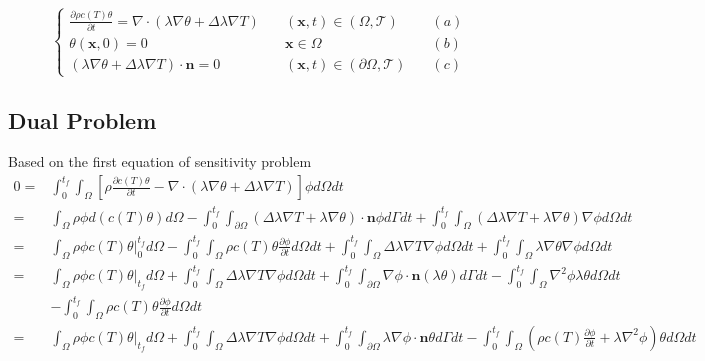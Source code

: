 \documentclass[UTF-8]{article}
\begin{document}
\begin{equation}
	\left\{
	\begin{array}{lll}
		\frac{\partial \rho c(T) \theta}{\partial t} = \nabla \cdot \left( \lambda \nabla \theta + \Delta \lambda \nabla T \right)	\quad & (\pmb{x}, t) \in (\Omega , \mathcal{T}) \quad & (a) \\
		\theta (\pmb{x}, 0) = 0 \quad & \pmb{x} \in \Omega \quad & (b) \\
		\left( \lambda \nabla \theta + \Delta \lambda \nabla T \right) \cdot \pmb{n} = 0 \quad & (\pmb{x}, t) \in (\partial \Omega, \mathcal{T}) \quad & (c)
	\end{array}
	\right.
\end{equation}

\subsection{Dual Problem}
Based on the first equation of sensitivity problem
\begin{align}
	0 = & \int_{0}^{t_f} \int_{\Omega} \left[ \rho \frac{\partial c(T) \theta}{\partial t} - \nabla \cdot \left( \lambda \nabla \theta + \Delta \lambda \nabla T \right) \right] \phi d\Omega dt \nonumber \\
	= & \int_{\Omega} \rho \phi d\left( c(T) \theta \right) d\Omega - \int_{0}^{t_f}\int_{\partial \Omega} \left( \Delta \lambda \nabla T + \lambda \nabla \theta \right) \cdot \pmb{n} \phi d\Gamma dt + \int_{0}^{t_f} \int_{\Omega} \left( \Delta \lambda \nabla T + \lambda \nabla \theta \right) \nabla \phi d\Omega dt \nonumber \\
	= & \int_{\Omega} \rho \phi c(T) \theta \big|_{0}^{t_f} d\Omega - \int_{0}^{t_f} \int_{\Omega} \rho c(T) \theta \frac{\partial \phi}{\partial t} d\Omega dt + \int_{0}^{t_f} \int_{\Omega} \Delta \lambda \nabla T \nabla \phi d\Omega dt + \int_{0}^{t_f} \int_{\Omega} \lambda \nabla \theta \nabla \phi d\Omega dt \nonumber \\
	= & \int_{\Omega} \rho \phi c(T) \theta \big|_{t_f} d\Omega + \int_{0}^{t_f} \int_{\Omega} \Delta \lambda \nabla T \nabla \phi d\Omega dt + \int_{0}^{t_f} \int_{\partial \Omega} \nabla \phi \cdot \pmb{n} (\lambda \theta) d\Gamma dt - \int_{0}^{t_f} \int_{\Omega} \nabla^2 \phi \lambda \theta d\Omega dt \nonumber \\
	& - \int_{0}^{t_f} \int_{\Omega} \rho c(T) \theta \frac{\partial \phi}{\partial t} d\Omega dt \nonumber \\
	= & \int_{\Omega} \rho \phi c(T) \theta \big|_{t_f} d\Omega + \int_{0}^{t_f} \int_{\Omega} \Delta \lambda \nabla T \nabla \phi d\Omega dt + \int_{0}^{t_f} \int_{\partial \Omega} \lambda \nabla \phi \cdot \pmb{n} \theta d\Gamma dt - \int_{0}^{t_f} \int_{\Omega} \left( \rho c(T) \frac{\partial \phi}{\partial t} + \lambda \nabla^2 \phi \right) \theta d\Omega dt \nonumber
\end{align}
\end{document}
